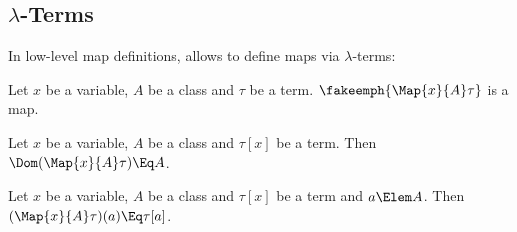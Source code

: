 \documentclass{stex}
\begin{document}
\subsection{$\lambda$-Terms}\label{sec:lambda-terms}

In low-level map definitions, \ForTheL allows to define maps via
$\lambda$-terms:

\begin{sparagraph}[style=symdoc,for=Map]
  \begin{signature*}
    Let $x$ be a variable, $A$ be a class and $\tau$ be a term.
    $\fakeemph{\Map{x}{A}\tau}$ is a map.
  \end{signature*}

  \begin{axiom*}
    Let $x$ be a variable, $A$ be a class and $\tau[x]$ be a term.
    Then $\Dom(\Map{x}{A}\tau) \Eq A$.
  \end{axiom*}

  \begin{axiom*}
    Let $x$ be a variable, $A$ be a class and $\tau[x]$ be a term and $a \Elem A$.
    Then $(\Map{x}{A}\tau)(a) \Eq \tau[a]$.
  \end{axiom*}
\end{sparagraph}


\ifinputref\else{}\fi
\end{document}
